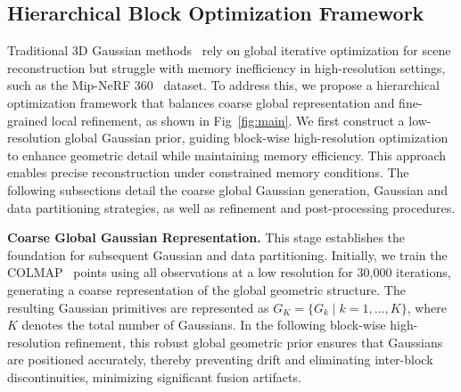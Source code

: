 \subsection{Hierarchical Block Optimization Framework}  
\label{3.2}

Traditional 3D Gaussian methods~\cite{3dgs,vcR} rely on global iterative optimization for scene reconstruction but struggle with memory inefficiency in high-resolution settings, such as the Mip-NeRF 360~\cite{mip} dataset. To address this, we propose a hierarchical optimization framework that balances coarse global representation and fine-grained local refinement, as shown in Fig~\ref{fig:main}. We first construct a low-resolution global Gaussian prior, guiding block-wise high-resolution optimization to enhance geometric detail while maintaining memory efficiency. This approach enables precise reconstruction under constrained memory conditions. The following subsections detail the coarse global Gaussian generation, Gaussian and data partitioning strategies, as well as refinement and post-processing procedures.

\noindent\textbf{Coarse Global Gaussian Representation.}
This stage establishes the foundation for subsequent Gaussian and data partitioning. Initially, we train the COLMAP~\cite{schoenberger2016mvs,schoenberger2016sfm} points using all observations at a low resolution for 30,000 iterations, generating a coarse representation of the global geometric structure. The resulting Gaussian primitives are represented as \( G_K = \{ G_k \mid k = 1, \ldots, K \} \), where \( K \) denotes the total number of Gaussians. In the following block-wise high-resolution refinement, this robust global geometric prior ensures that Gaussians are positioned accurately, thereby preventing drift and eliminating inter-block discontinuities, minimizing significant fusion artifacts.

